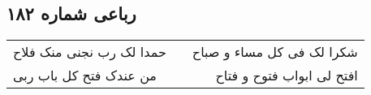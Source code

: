 \begin{center}
\section*{رباعی شماره ۱۸۲}
\label{sec:sh182}
\begin{longtable}{l p{0.5cm} r}
حمدا لک رب نجنی منک فلاح
&&
شکرا لک فی کل مساء و صباح
\\
من عندک فتح کل باب ربی
&&
افتح لی ابواب فتوح و فتاح
\\
\end{longtable}
\end{center}
